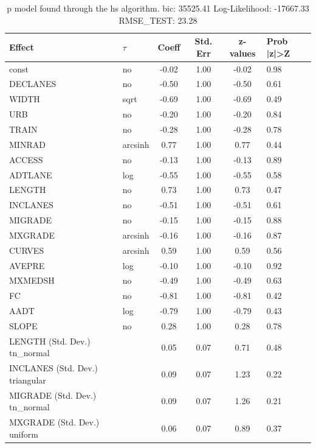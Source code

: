 \begin{table}
	\caption{p model found through the hs algorithm. bic: 35525.41 Log-Likelihood: -17667.33 RMSE_TEST: 23.28}
	\begin{center}
		\begin{tabular}{|l|l|c|c|c|l|}
			\hline
			Effect & $\tau$ & Coeff & Std. Err & z-values & Prob |z|>Z \\
			\hline
			const & no & -0.02 & 1.00 & -0.02 & 0.98 \\
			\hline
			DECLANES & no & -0.50 & 1.00 & -0.50 & 0.61 \\
			\hline
			WIDTH & sqrt & -0.69 & 1.00 & -0.69 & 0.49 \\
			\hline
			URB & no & -0.20 & 1.00 & -0.20 & 0.84 \\
			\hline
			TRAIN & no & -0.28 & 1.00 & -0.28 & 0.78 \\
			\hline
			MINRAD & arcsinh & 0.77 & 1.00 & 0.77 & 0.44 \\
			\hline
			ACCESS & no & -0.13 & 1.00 & -0.13 & 0.89 \\
			\hline
			ADTLANE & log & -0.55 & 1.00 & -0.55 & 0.58 \\
			\hline
			LENGTH & no & 0.73 & 1.00 & 0.73 & 0.47 \\
			\hline
			INCLANES & no & -0.51 & 1.00 & -0.51 & 0.61 \\
			\hline
			MIGRADE & no & -0.15 & 1.00 & -0.15 & 0.88 \\
			\hline
			MXGRADE & arcsinh & -0.16 & 1.00 & -0.16 & 0.87 \\
			\hline
			CURVES & arcsinh & 0.59 & 1.00 & 0.59 & 0.56 \\
			\hline
			AVEPRE & log & -0.10 & 1.00 & -0.10 & 0.92 \\
			\hline
			MXMEDSH & no & -0.49 & 1.00 & -0.49 & 0.63 \\
			\hline
			FC & no & -0.81 & 1.00 & -0.81 & 0.42 \\
			\hline
			AADT & log & -0.79 & 1.00 & -0.79 & 0.43 \\
			\hline
			SLOPE & no & 0.28 & 1.00 & 0.28 & 0.78 \\
			\hline
			LENGTH (Std. Dev.) tn_normal &  & 0.05 & 0.07 & 0.71 & 0.48 \\
			\hline
			INCLANES (Std. Dev.) triangular &  & 0.09 & 0.07 & 1.23 & 0.22 \\
			\hline
			MIGRADE (Std. Dev.) tn_normal &  & 0.09 & 0.07 & 1.26 & 0.21 \\
			\hline
			MXGRADE (Std. Dev.) uniform &  & 0.06 & 0.07 & 0.89 & 0.37 \\

\end{tabular}
\end{center}
\end{table}
